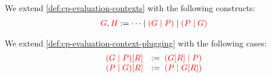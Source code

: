 \begin{definition}\label{def:nc-evaluation-contexts}
  We extend \cref{def:cp-evaluation-contexts} with the following constructs:
  \begin{align*}
    \textcolor{red}{G}, \textcolor{red}{H} := \dots \mid \textcolor{red}{(G \mid P)} \mid \textcolor{red}{(P \mid G)}
  \end{align*}
\end{definition}
\begin{definition}[Plugging]\label{def:nc-evaluation-context-plugging}
  We extend \cref{def:cp-evaluation-context-plugging} with the following cases:
  \begin{gather*}
    \begin{array}{ll}
      \textcolor{red}{{(G \mid P)}[{R}]}
      & := \; \textcolor{red}{({G}[{R}] \mid P)}
      \\
      \textcolor{red}{{(P \mid G)}[{R}]}
      & := \; \textcolor{red}{(P \mid {G}[{R}])}
    \end{array}
  \end{gather*}
\end{definition}
